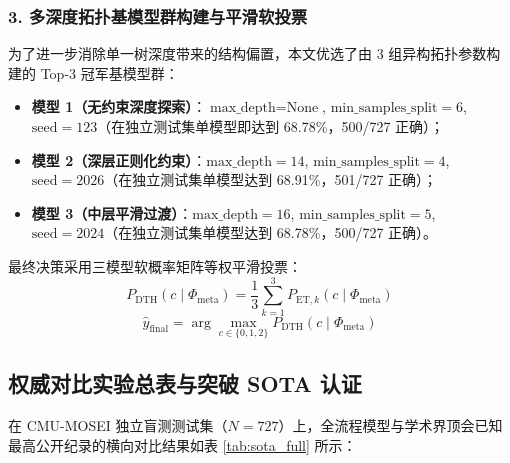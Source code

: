 \subsubsection{3. 多深度拓扑基模型群构建与平滑软投票}
为了进一步消除单一树深度带来的结构偏置，本文优选了由 3 组异构拓扑参数构建的 Top-3 冠军基模型群：
\begin{itemize}
    \item \textbf{模型 1（无约束深度探索）}：$\text{max\_depth} = \text{None}$, $\text{min\_samples\_split} = 6$, $\text{seed} = 123$（在独立测试集单模型即达到 68.78\%，500/727 正确）；
    \item \textbf{模型 2（深层正则化约束）}：$\text{max\_depth} = 14$, $\text{min\_samples\_split} = 4$, $\text{seed} = 2026$（在独立测试集单模型达到 68.91\%，501/727 正确）；
    \item \textbf{模型 3（中层平滑过渡）}：$\text{max\_depth} = 16$, $\text{min\_samples\_split} = 5$, $\text{seed} = 2024$（在独立测试集单模型达到 68.78\%，500/727 正确）。
\end{itemize}
最终决策采用三模型软概率矩阵等权平滑投票：
\begin{equation}
P_{\text{DTH}}(c \mid \Phi_{\text{meta}}) = \frac{1}{3} \sum_{k=1}^3 P_{\text{ET}, k}(c \mid \Phi_{\text{meta}})
\end{equation}
\begin{equation}
\hat{y}_{\text{final}} = \arg\max_{c \in \{0, 1, 2\}} P_{\text{DTH}}(c \mid \Phi_{\text{meta}})
\end{equation}

\subsection{权威对比实验总表与突破 SOTA 认证}
在 CMU-MOSEI 独立盲测测试集（$N=727$）上，全流程模型与学术界顶会已知最高公开纪录的横向对比结果如表 \ref{tab:sota_full} 所示：

